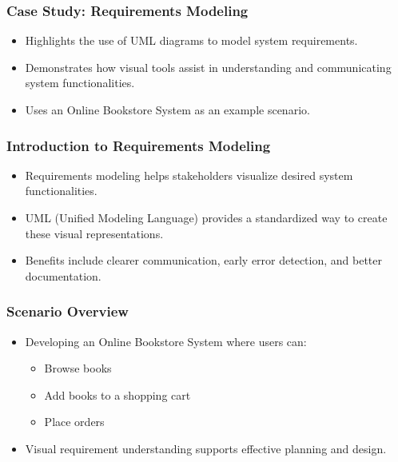 \documentclass{beamer}
\begin{document}
\begin{frame}[fragile]
    \frametitle{Case Study: Requirements Modeling}
    \begin{itemize}
        \item Highlights the use of UML diagrams to model system requirements.
        \item Demonstrates how visual tools assist in understanding and communicating system functionalities.
        \item Uses an Online Bookstore System as an example scenario.
    \end{itemize}
\end{frame}

\begin{frame}[fragile]
    \frametitle{Introduction to Requirements Modeling}
    \begin{itemize}
        \item Requirements modeling helps stakeholders visualize desired system functionalities.
        \item UML (Unified Modeling Language) provides a standardized way to create these visual representations.
        \item Benefits include clearer communication, early error detection, and better documentation.
    \end{itemize}
\end{frame}

\begin{frame}[fragile]
    \frametitle{Scenario Overview}
    \begin{itemize}
        \item Developing an Online Bookstore System where users can:
        \begin{itemize}
            \item Browse books
            \item Add books to a shopping cart
            \item Place orders
        \end{itemize}
        \item Visual requirement understanding supports effective planning and design.
    \end{itemize}
\end{frame}
\end{document}
